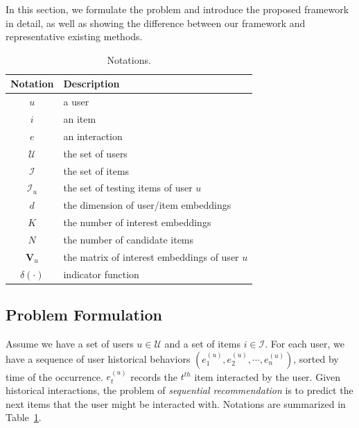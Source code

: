 In this section, we formulate the problem and introduce the proposed framework in detail, as well as showing the difference between our framework and representative existing methods.

\begin{table}
  \centering
  \caption{\label{tab:notation} Notations.}
  \begin{tabular}{c|p{2.55in}}
    \hline \hline
    \textbf{Notation} & \textbf{Description} \\
    \hline
    $u$ & a user \\
    $i$ & an item \\
    $e$ & an interaction \\
    $\mathcal{U}$ & the set of users \\
    $\mathcal{I}$ & the set of items \\
    $\mathcal{I}_u$ & the set of testing items of user $u$ \\
    $d$ & the dimension of user/item embeddings \\
    $K$ & the number of interest embeddings \\
    $N$ & the number of candidate items\\
    $\mathbf{V}_u$ & the matrix of interest embeddings of user $u$ \\
    $\delta(\cdot)$ & indicator function \\
    \hline \hline
  \end{tabular}
\end{table}

\subsection{Problem Formulation}
Assume we have a set of users $u\in \mathcal{U}$ and a set of items $i\in \mathcal{I}$. For each user, we have a sequence of user historical behaviors $(e^{(u)}_{1}, e^{(u)}_{2}, \cdots, e^{(u)}_{n})$, sorted by time of the occurrence. $e^{(u)}_{t}$ records the $t^{th}$ item interacted by the user. Given historical interactions, the problem of \textit{sequential recommendation} is to predict the next items that the user might be interacted with. 
Notations are summarized in Table~\ref{tab:notation}.

